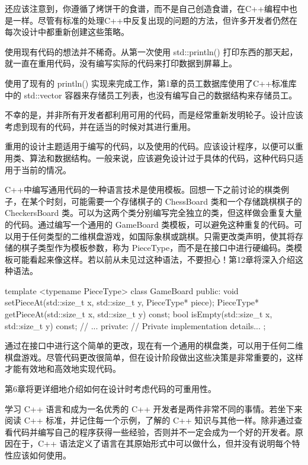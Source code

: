 还应该注意到，你遵循了烤饼干的食谱，而不是自己创造食谱，在C++编程中也是一样。尽管有标准的处理C++中反复出现的问题的方法，但许多开发者仍然在每次设计中都重新创建这些策略。

使用现有代码的想法并不稀奇。从第一次使用 std::println() 打印东西的那天起，就一直在重用代码，没有编写实际的代码来打印数据到屏幕上。

使用了现有的 println() 实现来完成工作，第1章的员工数据库使用了C++标准库中的 std::vector 容器来存储员工列表，也没有编写自己的数据结构来存储员工。

不幸的是，并非所有开发者都利用可用的代码，而是经常重新发明轮子。设计应该考虑到现有的代码，并在适当的时候对其进行重用。


重用的设计主题适用于编写的代码，以及使用的代码。应该设计程序，以便可以重用类、算法和数据结构。一般来说，应该避免设计过于具体的代码，这种代码只适用于当前的情况。

C++中编写通用代码的一种语言技术是使用模板。回想一下之前讨论的棋类例子，在某个时刻，可能需要一个存储棋子的 ChessBoard 类和一个存储跳棋棋子的 CheckersBoard 类。可以为这两个类分别编写完全独立的类，但这样做会重复大量的代码。通过编写一个通用的 GameBoard 类模板，可以避免这种重复的代码。可以用于任何类型的二维棋盘游戏，如国际象棋或跳棋。只需更改类声明，使其将存储的棋子类型作为模板参数，称为 PieceType，而不是在接口中进行硬编码。类模板可能看起来像这样。若以前从未见过这种语法，不要担心！第12章将深入介绍这种语法。

\begin{cpp}
template <typename PieceType>
class GameBoard
{
    public:
        void setPieceAt(std::size_t x, std::size_t y, PieceType* piece);
        PieceType* getPieceAt(std::size_t x, std::size_t y) const;
        bool isEmpty(std::size_t x, std::size_t y) const;
        // ...
    private:
        // Private implementation details...
};
\end{cpp}

通过在接口中进行这个简单的更改，现在有一个通用的棋盘类，可以用于任何二维棋盘游戏。尽管代码更改很简单，但在设计阶段做出这些决策是非常重要的，这样才能有效地和高效地实现代码。

第6章将更详细地介绍如何在设计时考虑代码的可重用性。


学习 C++ 语言和成为一名优秀的 C++ 开发者是两件非常不同的事情。若坐下来阅读 C++ 标准，并记住每一个示例，了解的 C++ 知识与其他一样。除非通过查看代码并编写自己的程序获得一些经验，否则并不一定会成为一个好的开发者。原因在于，C++ 语法定义了语言在其原始形式中可以做什么，但并没有说明每个特性应该如何使用。

